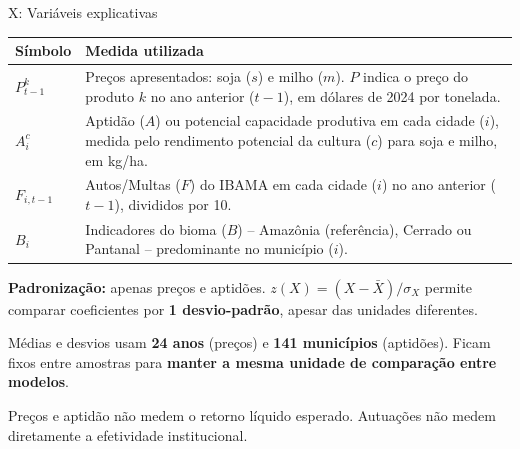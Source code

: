 \documentclass[aspectratio=169,11pt]{beamer}
\newcommand{\fonte}[1]{\par\vfill{\fontsize{7.5}{9}\selectfont\color{gray}Fonte: #1\par}}
\newcommand{\tpar}{\par\vspace{2mm}}
\begin{document}
\begin{frame}{X: Variáveis explicativas}
\small
\begin{tabularx}{\textwidth}{P{1.7cm} L}
\toprule
\textbf{Símbolo} & \textbf{Medida utilizada}\\
\midrule
$P^k_{t-1}$ & Preços apresentados: soja ($s$) e milho ($m$). $P$ indica o preço do produto $k$ no ano anterior ($t-1$), em dólares de 2024 por tonelada.\\[1.5mm]
$A_i^c$ & Aptidão ($A$) ou potencial capacidade produtiva em cada cidade ($i$), medida pelo rendimento potencial da cultura ($c$) para soja e milho, em kg/ha.\\[1.5mm]
$F_{i,t-1}$ & Autos/Multas ($F$) do IBAMA em cada cidade ($i$) no ano anterior ($t-1$), divididos por 10.\\[1.5mm]
$B_i$ & Indicadores do bioma ($B$) -- Amazônia (referência), Cerrado ou Pantanal -- predominante no município ($i$).\\
\bottomrule
\end{tabularx}
\smallskip
\textbf{Padronização:} apenas preços e aptidões. $z(X)=(X-\bar X)/\sigma_X$ permite comparar coeficientes por \textbf{1 desvio-padrão}, apesar das unidades diferentes.
\par\smallskip
Médias e desvios usam \textbf{24 anos} (preços) e \textbf{141 municípios} (aptidões). Ficam fixos entre amostras para \textbf{manter a mesma unidade de comparação entre modelos}.
\tpar
Preços e aptidão não medem o retorno líquido esperado. Autuações não medem diretamente a efetividade institucional.
\end{frame}
\end{document}
